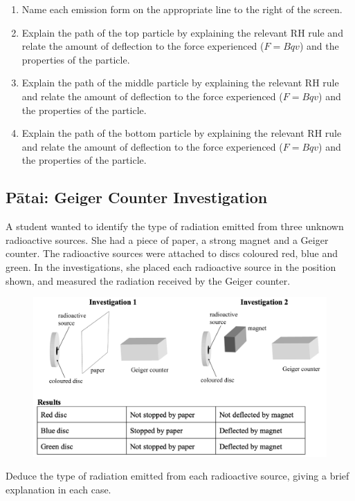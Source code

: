 \documentclass[12pt]{report}
\begin{document}
{\begin{enumerate}
	\item Name each emission form on the appropriate line to the right of the screen.
	\item Explain the path of the top particle by explaining the relevant RH rule and relate the amount of deflection to the force experienced ($F=Bqv$) and the properties of the particle.\vspace{3cm}
	\item Explain the path of the middle particle by explaining the relevant RH rule and relate the amount of deflection to the force experienced ($F=Bqv$) and the properties of the particle.\vspace{3cm}
	\item Explain the path of the bottom particle by explaining the relevant RH rule and relate the amount of deflection to the force experienced ($F=Bqv$) and the properties of the particle.\vspace{3cm}
\end{enumerate}

\newpage
\subsection{Pātai: Geiger Counter Investigation}
A student wanted to identify the type of radiation emitted from three unknown radioactive sources. She had a piece of paper, a strong magnet and a Geiger counter. The radioactive sources were attached to discs coloured red, blue and green. In the investigations, she placed each radioactive source in the position shown, and measured the radiation received by the Geiger counter.

\begin{figure}[ht]
	\centering
	\includegraphics[width=0.8\linewidth]{geiger-investigation.png}
\end{figure}

Deduce the type of radiation emitted from each radioactive source, giving a brief explanation in each case.

}
\end{document}
